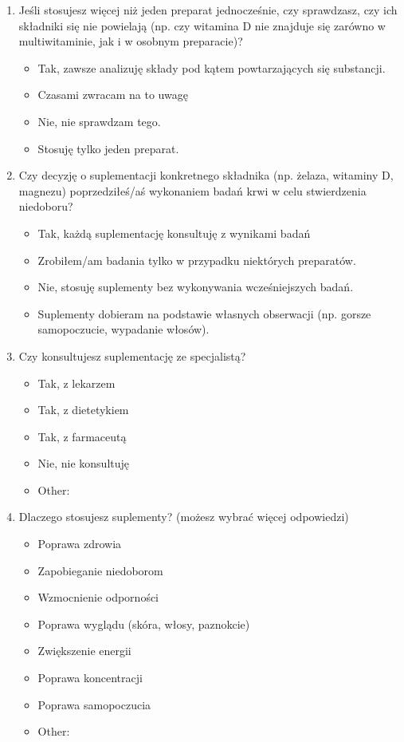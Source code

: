 \documentclass[a4paper, 12pt, oneside]{article}
\begin{document}
\begin{enumerate}
    \item Jeśli stosujesz więcej niż jeden preparat jednocześnie, czy sprawdzasz, czy ich składniki się nie powielają (np. czy witamina D nie znajduje się zarówno w multiwitaminie, jak i w osobnym preparacie)?
    \begin{itemize}
        \item Tak, zawsze analizuję składy pod kątem powtarzających się substancji.
        \item Czasami zwracam na to uwagę
        \item Nie, nie sprawdzam tego.
        \item Stosuję tylko jeden preparat.
    \end{itemize}

    \item Czy decyzję o suplementacji konkretnego składnika (np. żelaza, witaminy D, magnezu) poprzedziłeś/aś wykonaniem badań krwi w celu stwierdzenia niedoboru?
    \begin{itemize}
        \item Tak, każdą suplementację konsultuję z wynikami badań
        \item Zrobiłem/am badania tylko w przypadku niektórych preparatów.
        \item Nie, stosuję suplementy bez wykonywania wcześniejszych badań.
        \item Suplementy dobieram na podstawie własnych obserwacji (np. gorsze samopoczucie, wypadanie włosów).
    \end{itemize}

    \item Czy konsultujesz suplementację ze specjalistą?
    \begin{itemize}
        \item Tak, z lekarzem
        \item Tak, z dietetykiem
        \item Tak, z farmaceutą
        \item Nie, nie konsultuję
        \item Other:
    \end{itemize}

    \item Dlaczego stosujesz suplementy? (możesz wybrać więcej odpowiedzi)
    \begin{itemize}
        \item Poprawa zdrowia
        \item Zapobieganie niedoborom
        \item Wzmocnienie odporności
        \item Poprawa wyglądu (skóra, włosy, paznokcie)
        \item Zwiększenie energii
        \item Poprawa koncentracji
        \item Poprawa samopoczucia
        \item Other:
    \end{itemize}


\end{enumerate}
\end{document}
